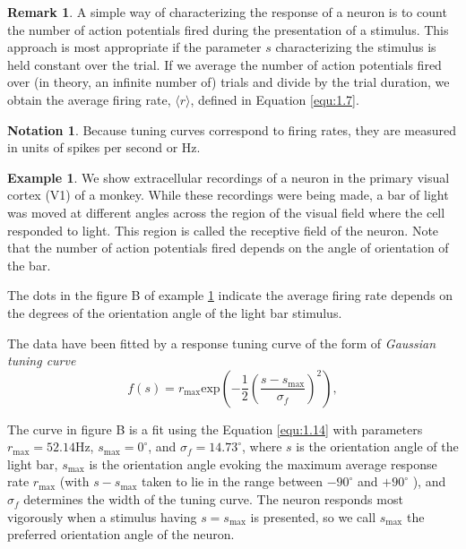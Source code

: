 \documentclass[letterpaper,oneside]{book}
\numberwithin{equation}{chapter}
\theoremstyle{definition}
\newtheorem{exm}[thm]{Example}
\newtheorem{ntn}{Notation}
\newtheorem{rem}{Remark}[chapter]
\begin{document}
\begin{multicols}{2}
\begin{rem}
  A simple way of characterizing the response of a neuron is to count the
number of action potentials fired during the presentation of a stimulus.
This approach is most appropriate if the parameter $s$ characterizing the
stimulus is held constant over the trial. If we average the number of action potentials 
fired over (in theory, an infinite number of) trials and divide by the trial duration, 
we obtain the average firing rate, $ \langle r\rangle$, defined in Equation \ref{equ:1.7}.
\end{rem}

\begin{ntn}
  Because tuning curves correspond to firing rates, they are measured in units of spikes 
  per second or Hz.
\end{ntn}

\begin{exm}
  \label{fig:1.5}
   We show extracellular recordings of a neuron in the primary visual cortex (V1) of 
a monkey. While these recordings were being made, a
bar of light was moved at different angles across the region of the visual
field where the cell responded to light. This region is called the receptive 
field of the neuron. Note that the number of action potentials fired
depends on the angle of orientation of the bar.

The dots in the figure B of example \ref{fig:1.5} indicate the average firing rate depends on the degrees of the orientation angle of the light bar stimulus.

The data have been fitted by a response tuning curve of the form of \emph{Gaussian tuning curve}
\begin{equation}
  \label{equ:1.14}
  f(s)=r_{\text{max}}\text{exp}\left(-\frac{1}{2}\left(\frac{s-s_{\text{max}}}{\sigma_f}\right)^2\right),
\end{equation}

The curve  in figure B is a fit using
the Equation \ref{equ:1.14} with parameters $r_{\text{max}} = 52 . 14 $Hz, $s_{\text{max}}= 0 ^\circ$,
 and $\sigma_f= 14 . 73 ^\circ $,
where $s$ is the orientation angle of the light bar, $s_{\text{max}}$ is the orientation angle
evoking the maximum average response rate $r_{\text{max}}$ (with $s-s_{\text{max}} $ taken 
to lie in the range between $- 90^\circ $ and $+90^\circ$  ), and $\sigma_f$ determines the 
width of the tuning curve. The neuron responds most vigorously when a stimulus
having $s=s_{\text{max}} $ is presented, so we call $s_{\text{max}}$ the preferred orientation angle
of the neuron.


\end{exm}
\end{multicols}
\end{document}
